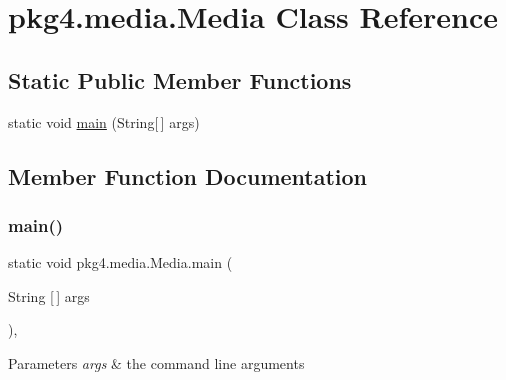 \hypertarget{classpkg4_1_1media_1_1_media}{}\section{pkg4.\+media.\+Media Class Reference}
\label{classpkg4_1_1media_1_1_media}
\subsection*{Static Public Member Functions}
\begin{DoxyCompactItemize}
\item 
static void \mbox{\hyperlink{classpkg4_1_1media_1_1_media_a216f28133ebec0e75994083238eb4a8d}{main}} (String\mbox{[}$\,$\mbox{]} args)
\end{DoxyCompactItemize}


\subsection{Member Function Documentation}
\mbox{\label{classpkg4_1_1media_1_1_media_a216f28133ebec0e75994083238eb4a8d}} 
\subsubsection{\texorpdfstring{main()}{main()}}
{\footnotesize\ttfamily static void pkg4.\+media.\+Media.\+main (\begin{DoxyParamCaption}\item[{String \mbox{[}$\,$\mbox{]}}]{args }\end{DoxyParamCaption})\hspace{0.3cm}{\ttfamily [inline]}, {\ttfamily [static]}}


\begin{DoxyParams}{Parameters}
{\em args} & the command line arguments \\
\hline
\end{DoxyParams}

